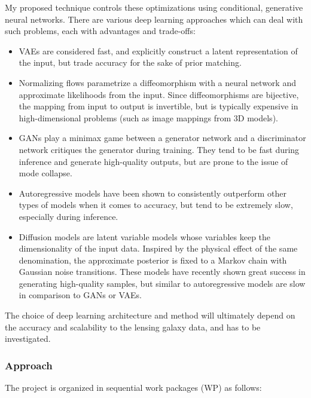 \documentclass[a4paper,10pt]{article}
\begin{document}
My proposed technique controls these optimizations using conditional,
generative neural networks. There are various deep learning approaches
which can deal with such problems, each with advantages and
trade-offs:
\begin{itemize}[leftmargin=*]
\item VAEs \citep{Kingma13} are considered fast, and explicitly
construct a latent representation of the input, but trade accuracy
for the sake of prior matching.
\item Normalizing flows \citep{Rezende15} parametrize a diffeomorphism
with a neural network and approximate likelihoods from the
input. Since diffeomorphisms are bijective, the mapping from input
to output is invertible, but is typically expensive in
high-dimensional problems (such as image mappings from 3D models).
\item GANs \citep{Goodfellow14} play a minimax game between a generator
network and a discriminator network critiques the generator during
training. They tend to be fast during inference and generate
high-quality outputs, but are prone to the issue of mode collapse.
\item Autoregressive models \citep{Parmar18} have been shown to consistently outperform
other types of models when it comes to accuracy, but tend to be
extremely slow, especially during inference.
\item Diffusion models \citep{Sohl-Dickstein15,Ho20} are latent
variable models whose variables keep the dimensionality of the input
data. Inspired by the physical effect of the same denomination, the
approximate posterior is fixed to a Markov chain with Gaussian noise
transitions. These models have recently shown great success in
generating high-quality samples, but similar to autoregressive
models are slow in comparison to GANs or VAEs.
\end{itemize}

The choice of deep learning architecture and method will ultimately
depend on the accuracy and scalability to the lensing galaxy data, and
has to be investigated.

\subsubsection{Approach}
\label{sec:org7229d62}

The project is organized in sequential work packages (WP) as follows:
\end{document}
